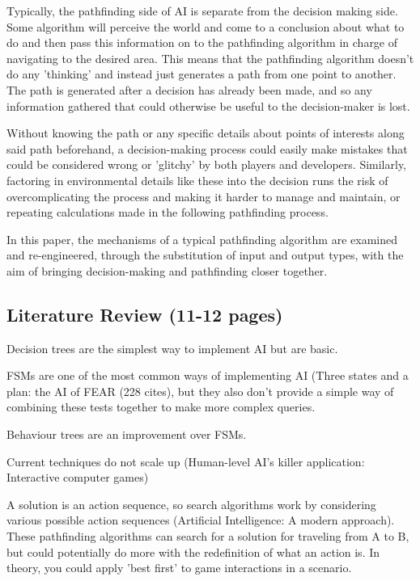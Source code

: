 \documentclass[10pt]{article}
\begin{document}
Typically, the pathfinding side of AI is separate from the decision making side. Some algorithm will perceive the world and come to a conclusion about what to do and then pass this information on to the pathfinding algorithm in charge of navigating to the desired area. This means that the pathfinding algorithm doesn't do any 'thinking' and instead just generates a path from one point to another. The path is generated after a decision has already been made, and so any information gathered that could otherwise be useful to the decision-maker is lost.

Without knowing the path or any specific details about points of interests along said path beforehand, a decision-making process could easily make mistakes that could be considered wrong or 'glitchy' by both players and developers. Similarly, factoring in environmental details like these into the decision runs the risk of overcomplicating the process and making it harder to manage and maintain, or repeating calculations made in the following pathfinding process.

In this paper, the mechanisms of a typical pathfinding algorithm are examined and re-engineered, through the substitution of input and output types, with the aim of bringing decision-making and pathfinding closer together.

\subsection{Literature Review (11-12 pages)}

Decision trees are the simplest way to implement AI but are basic.

FSMs are one of the most common ways of implementing AI (Three states and a plan: the AI of FEAR (228 cites), but they also don't provide a simple way of combining these tests together to make more complex queries.

Behaviour trees are an improvement over FSMs.

Current techniques do not scale up (Human-level AI's killer application: Interactive computer games)

A solution is an action sequence, so search algorithms work by considering various possible action sequences (Artificial Intelligence: A modern approach). These pathfinding algorithms can search for a solution for traveling from A to B, but could potentially do more with the redefinition of what an action is. In theory, you could apply 'best first' to game interactions in a scenario.
\end{document}
